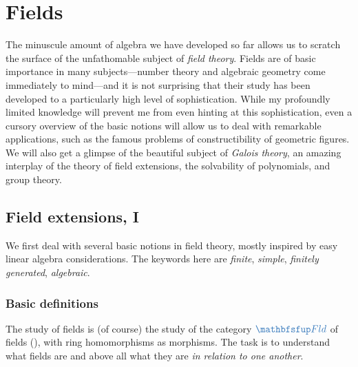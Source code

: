 \chapter{Fields}%
\label{chap:fields}

The minuscule amount of algebra we have developed so far allows us to
scratch the surface of the unfathomable subject of \emph{field
  theory}.  Fields are of basic importance in many subjects---number
theory and algebraic geometry come immediately to mind---and it is not
surprising that their study has been developed to a particularly high
level of sophistication. While my profoundly limited knowledge will
prevent me from even hinting at this sophistication, even a cursory
overview of the basic notions will allow us to deal with remarkable
applications, such as the famous problems of constructibility of
geometric figures. We will also get a glimpse of the beautiful subject
of \emph{Galois theory}, an amazing interplay of the theory of field
extensions, the solvability of polynomials, and group theory.

\section{Field extensions, I}%
\label{sec:fields:field-extensions-i}

We first deal with several basic notions in field theory, mostly
inspired by easy linear algebra considerations. The keywords here are
\emph{finite}, \emph{simple}, \emph{finitely generated},
\emph{algebraic}.

\subsection{Basic definitions}%
\label{subsec:fields:basic-definitions}
The study of fields is (of course) the study of the category
$\categ{Fld}$ of fields (), with ring
homomorphisms as morphisms. The task is to understand what fields are
and above all what they are \emph{in relation to one another}.

